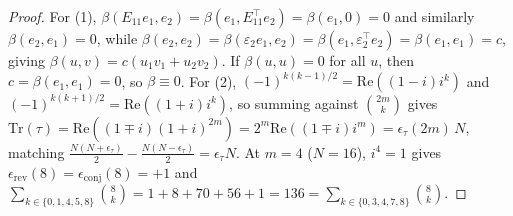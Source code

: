 \documentclass[11pt,a4paper]{article}
\theoremstyle{definition}
\begin{document}
\begin{proof}
For (1), $\beta(E_{11} e_1, e_2) = \beta(e_1, E_{11}^\top e_2) = \beta(e_1, 0) = 0$ and similarly $\beta(e_2, e_1) = 0$, while $\beta(e_2, e_2) = \beta(\varepsilon_2 e_1, e_2) = \beta(e_1, \varepsilon_2^\top e_2) = \beta(e_1, e_1) = c$, giving $\beta(u, v) = c(u_1 v_1 + u_2 v_2)$. If $\beta(u, u) = 0$ for all $u$, then $c = \beta(e_1, e_1) = 0$, so $\beta \equiv 0$. For (2), $(-1)^{k(k-1)/2} = \mathrm{Re}((1-i)i^k)$ and $(-1)^{k(k+1)/2} = \mathrm{Re}((1+i)i^k)$, so summing against $\binom{2m}{k}$ gives $\mathrm{Tr}(\tau) = \mathrm{Re}((1 \mp i)(1+i)^{2m}) = 2^m \mathrm{Re}((1 \mp i)i^m) = \epsilon_\tau(2m)\,N$, matching $\frac{N(N+\epsilon_\tau)}{2} - \frac{N(N-\epsilon_\tau)}{2} = \epsilon_\tau N$. At $m = 4$ ($N = 16$), $i^4 = 1$ gives $\epsilon_{\mathrm{rev}}(8) = \epsilon_{\mathrm{conj}}(8) = +1$ and $\sum_{k \in \{0,1,4,5,8\}} \binom{8}{k} = 1 + 8 + 70 + 56 + 1 = 136 = \sum_{k \in \{0,3,4,7,8\}} \binom{8}{k}$.
\end{proof}
\end{document}
